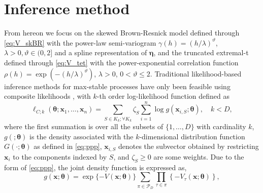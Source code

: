 \documentclass[12pt]{article}
\begin{document}
\section{Inference method} %
\label{sec:inference} %

From hereon we focus on the skewed Brown-Resnick model defined through \eqref{eq:V_skBR} with the power-law semi-variogram $\gamma(h) = (h/\lambda)^\vartheta$, $\lambda>0, \vartheta \in (0,2]$ and a spline representation of $\bm \eta$, and the truncated extremal-t defined through \eqref{eq:V_tet} with the power-exponential correlation function $\rho(h) = \exp(-(h/\lambda)^\vartheta)$, $\lambda>0$, $0 < \vartheta \leq 2$. 
Traditional likelihood-based inference methods for max-stable processes have only been feasible using composite likelihoods \citep{Padoan.etal:2010,Castruccio.etal:2016}, with $k$-th order log-likelihood function defined as
\begin{equation}
\label{eq:composite}
\ell_{C;k}(\bm \theta;\bm x_1,\dots,\bm x_n)=\sum_{S \in K_k; \forall K_k} \zeta_S \sum_{i=1}^n\log g(\bm x_{i,S};\bm \theta), \quad k< D,
\end{equation}
where the first summation is over all the subsets of $\{1,\ldots,D\}$ with cardinality $k$, $g(;\bm \theta)$ is the density associated with the $k$-dimensional distribution function $G(\cdot; \bm \theta)$ as defined in \eqref{eq:ppp}, $\bm x_{i,S}$ denotes the subvector obtained by restricting $\bm x_i$ to the components indexed by $S$, and $\zeta_S \geq 0$ are some weights. Due to the form of \eqref{eq:ppp}, the joint density function is expressed as,
\begin{equation*}
\label{eq:densitymaxstable}
    g(\bm x;\bm{\theta})=\exp\{-V(\bm x;\bm\theta)\}\sum_{\pi\in \mathcal P_D}\prod_{\tau\in \pi}\left\{-V_\tau(\bm x;\bm \theta)\right\},
\end{equation*} 
\end{document}
